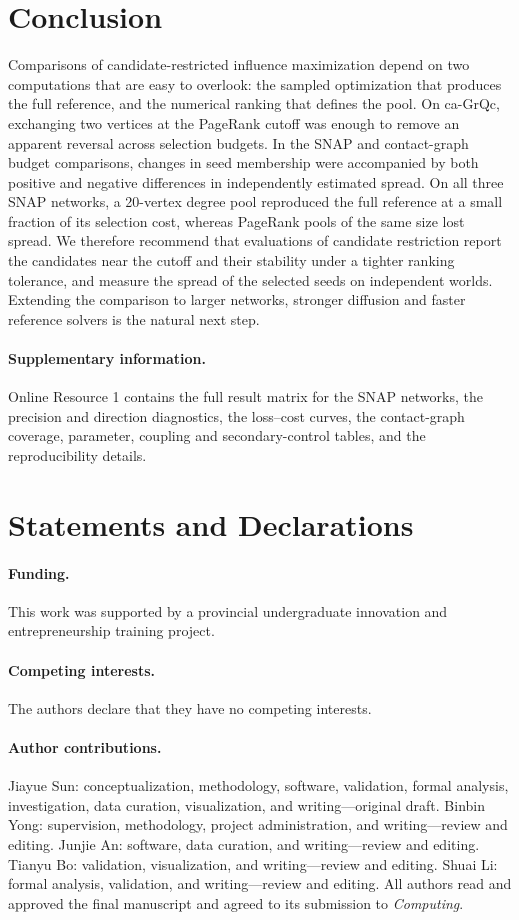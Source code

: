 \documentclass[smallextended]{svjour3}
\begin{document}
\section{Conclusion}
Comparisons of candidate-restricted influence maximization depend on two computations that are easy to overlook: the sampled optimization that produces the full reference, and the numerical ranking that defines the pool. On ca-GrQc, exchanging two vertices at the PageRank cutoff was enough to remove an apparent reversal across selection budgets. In the SNAP and contact-graph budget comparisons, changes in seed membership were accompanied by both positive and negative differences in independently estimated spread. On all three SNAP networks, a 20-vertex degree pool reproduced the full reference at a small fraction of its selection cost, whereas PageRank pools of the same size lost spread. We therefore recommend that evaluations of candidate restriction report the candidates near the cutoff and their stability under a tighter ranking tolerance, and measure the spread of the selected seeds on independent worlds. Extending the comparison to larger networks, stronger diffusion and faster reference solvers is the natural next step.

\paragraph{Supplementary information.} Online Resource 1 contains the full result matrix for the SNAP networks, the precision and direction diagnostics, the loss--cost curves, the contact-graph coverage, parameter, coupling and secondary-control tables, and the reproducibility details.
\section*{Statements and Declarations}
\paragraph{Funding.} This work was supported by a provincial undergraduate innovation and entrepreneurship training project.
\paragraph{Competing interests.} The authors declare that they have no competing interests.
\paragraph{Author contributions.} Jiayue Sun: conceptualization, methodology, software, validation, formal analysis, investigation, data curation, visualization, and writing---original draft. Binbin Yong: supervision, methodology, project administration, and writing---review and editing. Junjie An: software, data curation, and writing---review and editing. Tianyu Bo: validation, visualization, and writing---review and editing. Shuai Li: formal analysis, validation, and writing---review and editing. All authors read and approved the final manuscript and agreed to its submission to \textit{Computing}.
\end{document}
